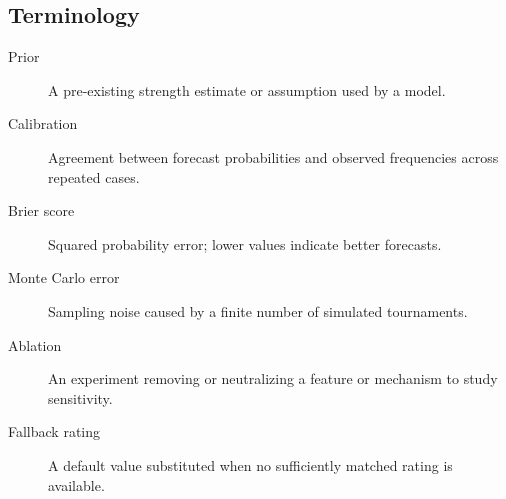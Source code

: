 \documentclass[11pt,a4paper]{article}
\begin{document}
\subsection{Terminology}
\begin{description}
\item[Prior] A pre-existing strength estimate or assumption used by a model.
\item[Calibration] Agreement between forecast probabilities and observed frequencies across repeated cases.
\item[Brier score] Squared probability error; lower values indicate better forecasts.
\item[Monte Carlo error] Sampling noise caused by a finite number of simulated tournaments.
\item[Ablation] An experiment removing or neutralizing a feature or mechanism to study sensitivity.
\item[Fallback rating] A default value substituted when no sufficiently matched rating is available.
\end{description}
\end{document}
